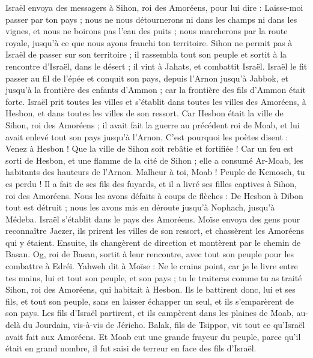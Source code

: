 \begin{multicols}{2}
Israël envoya des messagers à Sihon, roi des Amoréens, pour lui dire :
Laisse-moi passer par ton pays ; nous ne nous détournerons ni dans les champs ni dans les vignes, et nous ne boirons pas l’eau des puits ; nous marcherons par la route royale, jusqu'à ce que nous ayons franchi ton territoire.
Sihon ne permit pas à Israël de passer sur son territoire ; il rassembla tout son peuple et sortit à la rencontre d’Israël, dans le désert ; il vint à Jahats, et combattit Israël.
Israël le fit passer au fil de l'épée et conquit son pays, depuis l’Arnon jusqu'à Jabbok, et jusqu'à la frontière des enfants d’Ammon ; car la frontière des fils d’Ammon était forte.
Israël prit toutes les villes et s’établit dans toutes les villes des Amoréens, à Hesbon, et dans toutes les villes de son ressort.
Car Hesbon était la ville de Sihon, roi des Amoréens ; il avait fait la guerre au précédent roi de Moab, et lui avait enlevé tout son pays jusqu'à l’Arnon.
C'est pourquoi les poètes disent : Venez à Hesbon ! Que la ville de Sihon soit rebâtie et fortifiée !
Car un feu est sorti de Hesbon, et une flamme de la cité de Sihon ; elle a consumé Ar-Moab, les habitants des hauteurs de l’Arnon.
Malheur à toi, Moab ! Peuple de Kemosch, tu es perdu ! Il a fait de ses fils des fuyards, et il a livré ses filles captives à Sihon, roi des Amoréens.
Nous les avons défaits à coups de flèches : De Hesbon à Dibon tout est détruit ; nous les avons mis en déroute jusqu'à Nophach, jusqu'à Médeba.
Israël s’établit dans le pays des Amoréens.
Moïse envoya des gens pour reconnaître Jaezer, ils prirent les villes de son ressort, et chassèrent les Amoréens qui y étaient.
Ensuite, ils changèrent de direction et montèrent par le chemin de Basan. Og, roi de Basan, sortit à leur rencontre, avec tout son peuple pour les combattre à Edréï.
Yahweh dit à Moïse : Ne le crains point, car je le livre entre tes mains, lui et tout son peuple, et son pays ; tu le traiteras comme tu as traité Sihon, roi des Amoréens, qui habitait à Hesbon.
Ils le battirent donc, lui et ses fils, et tout son peuple, sans en laisser échapper un seul, et ils s’emparèrent de son pays.
\VerseOne{}Les fils d'Israël partirent, et ils campèrent dans les plaines de Moab, au-delà du Jourdain, vis-à-vis de Jéricho.
Balak, fils de Tsippor, vit tout ce qu'Israël avait fait aux Amoréens.
Et Moab eut une grande frayeur du peuple, parce qu'il était en grand nombre, il fut saisi de terreur en face des fils d'Israël.

\end{multicols}
